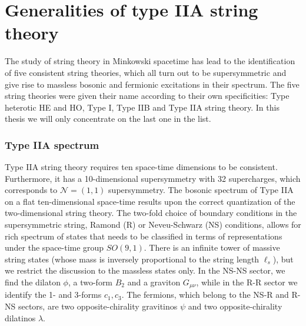 \chapter{Generalities of type IIA string theory}

The study of string theory in Minkowski spacetime has lead to the identification of five consistent string theories, which all turn out to be supersymmetric and give rise to massless bosonic and fermionic excitations in their spectrum. The five string theories were given their name according to their own specificities: Type heterotic HE and HO, Type I, Type IIB and Type IIA string theory. In this thesis we will only concentrate on the last one in the list. 

\subsection{Type IIA spectrum}
Type IIA string theory requires ten space-time dimensions to be consistent.
Furthermore, it has a 10-dimensional supersymmetry with 32 supercharges, which corresponds to $\mathcal N=(1,1)$ supersymmetry.
The bosonic spectrum of Type IIA on a flat ten-dimensional space-time results upon the correct quantization of the two-dimensional string theory. The two-fold choice of boundary conditions in the supersymmetric string, Ramond (R) or Neveu-Schwarz (NS) conditions, allows for rich spectrum of states that needs to be classified in terms of representations under the space-time group $SO(9,1)$. 
There is an infinite tower of massive string states (whose mass is inversely proportional to the string length $\ell_s$), but we restrict the discussion to the massless states only.
In the NS-NS sector, we find the dilaton $\phi$, a two-form $B_2$ and a graviton $G_{\mu\nu}$,
while in the R-R sector we identify the 1- and 3-forms $c_1, c_3$.
The fermions, which belong to the NS-R and R-NS sectors, are two opposite-chirality gravitinos $\psi$ and two opposite-chirality dilatinos $\lambda$.

